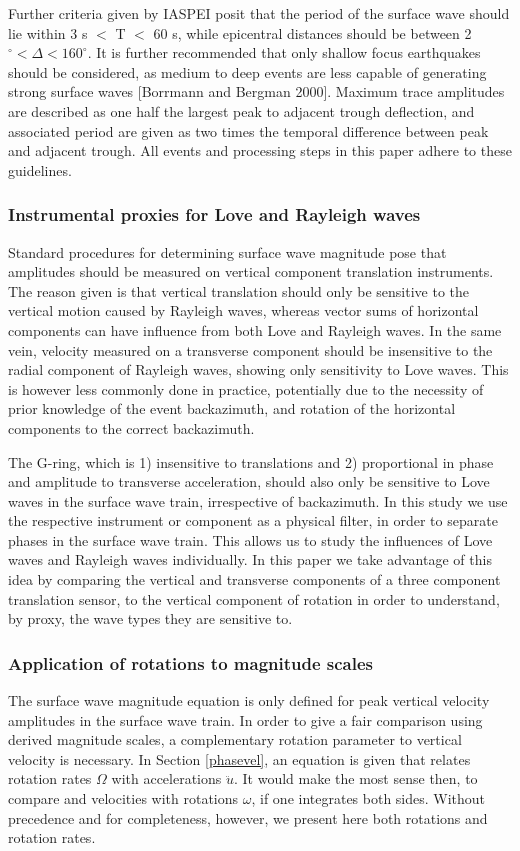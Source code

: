 \documentclass{gji}
\begin{document}
Further criteria given by IASPEI posit that the period of the surface wave should lie within 3 s $<$ T $<$ 60 s, while epicentral distances should be between 2$^\circ < \Delta < 160^\circ$. It is further recommended that only shallow focus earthquakes should be considered, as medium to deep events are less capable of generating strong surface waves [Borrmann and Bergman 2000]. %
Maximum trace amplitudes are described as one half the largest peak to adjacent trough deflection, and associated period are given as two times the temporal difference between peak and adjacent trough. All events and processing steps in this paper adhere to these guidelines.

\subsubsection{Instrumental proxies for Love and Rayleigh waves}
Standard procedures for determining surface wave magnitude pose that amplitudes should be measured on vertical component translation instruments. The reason given is that vertical translation should only be sensitive to  the vertical motion caused by Rayleigh waves, whereas vector sums of horizontal components can have influence from both Love and Rayleigh waves. In the same vein, velocity measured on a transverse component should be insensitive to the radial component of Rayleigh waves, showing only sensitivity to Love waves. This is however less commonly done in practice, potentially due to the necessity of prior knowledge of the event backazimuth, and rotation of the horizontal components to the correct backazimuth. 

The G-ring, which is 1) insensitive to translations and 2) proportional in phase and amplitude to transverse acceleration, should also only be sensitive to Love waves in the surface wave train, irrespective of backazimuth.  
In this study we use the respective instrument or component as a physical filter, in order to separate phases in the surface wave train. This allows us to study the influences of Love waves and Rayleigh waves individually. In this paper we take advantage of this idea by comparing the vertical and transverse components of a three component translation sensor, to the vertical component of rotation in order to understand, by proxy, the wave types they are sensitive to.

\subsubsection{Application of rotations to magnitude scales}
The surface wave magnitude equation is only defined for peak vertical velocity amplitudes in the surface wave train. In order to give a fair comparison using derived magnitude scales, a complementary rotation parameter to vertical velocity is necessary. In Section \ref{phasevel}, an equation is given that relates rotation rates $\Omega$ with accelerations $\ddot{u}$. It would make the most sense then, to compare and velocities with rotations $\omega$, if one integrates both sides. Without precedence and for completeness, however, we present here both rotations and rotation rates.
\end{document}
